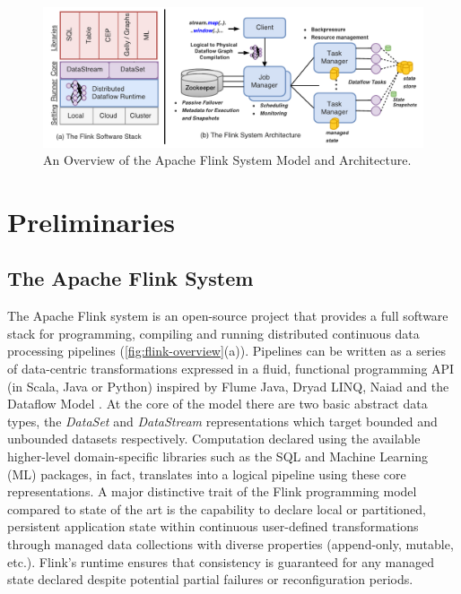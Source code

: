
\begin{figure}[t!]
\centering
\includegraphics[width=\textwidth]{figures/flinkoverview.pdf}
\caption{An Overview of the Apache Flink System Model and Architecture.} 
\label{fig:flink-overview}
\vspace{-4mm}
\end{figure}

\section{Preliminaries}
\label{sec:preliminaries}
\subsection{The Apache Flink System}

The Apache Flink system \cite{CUSTOM:web/Flink} is an open-source project that provides a full software stack for programming, compiling and running distributed continuous data processing pipelines (\autoref{fig:flink-overview}(a)). Pipelines can be written as a series of data-centric transformations expressed in a fluid, functional programming API (in Scala, Java or Python) inspired by Flume Java\cite{chambers2010flumejava}, Dryad LINQ\cite{yu2008dryadlinq}, Naiad\cite{murray2013naiad} and the Dataflow Model \cite{akidau2015dataflow}. At the core of the model there are two basic abstract data types, the \emph{DataSet} and \emph{DataStream} representations which target bounded and unbounded datasets respectively. Computation declared using the available higher-level domain-specific libraries such as the SQL and Machine Learning (ML) packages, in fact, translates into a logical pipeline using these core representations. A major distinctive trait of the Flink programming model compared to state of the art is the capability to declare local or partitioned, persistent application state within continuous user-defined transformations through managed data collections with diverse properties (append-only, mutable, etc.). Flink's runtime ensures that consistency is guaranteed for any managed state declared despite potential partial failures or reconfiguration periods.

